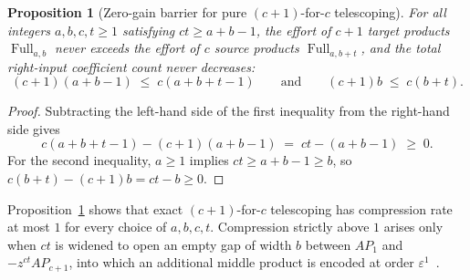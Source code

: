 \documentclass[11pt,a4paper]{article}
\theoremstyle{plain}
\newtheorem{proposition}[theorem]{Proposition}
\theoremstyle{definition}
\theoremstyle{remark}
\DeclareMathOperator{\Full}{Full}
\begin{document}
\begin{proposition}[Zero-gain barrier for pure $(c + 1)$-for-$c$ telescoping]
\label{prop:pure_telescoping}
For all integers $a, b, c, t \ge 1$ satisfying $ct \ge a + b - 1$, the effort of $c + 1$ target products $\Full_{a,b}$ never exceeds the effort of $c$ source products $\Full_{a, b+t}$, and the total right-input coefficient count never decreases:
\begin{equation}
    (c + 1)(a + b - 1) \;\le\; c(a + b + t - 1) \qquad\text{and}\qquad (c + 1)b \;\le\; c(b + t) .
    \label{eq:pure_tele_barrier}
\end{equation}
\end{proposition}
\begin{proof}
Subtracting the left-hand side of the first inequality from the right-hand side gives
\begin{equation}
    c(a + b + t - 1) - (c + 1)(a + b - 1) \;=\; ct - (a + b - 1) \;\ge\; 0 .
    \label{eq:pure_tele_diff}
\end{equation}
For the second inequality, $a \ge 1$ implies $ct \ge a + b - 1 \ge b$, so $c(b + t) - (c + 1)b = ct - b \ge 0$.
\end{proof}

Proposition~\ref{prop:pure_telescoping} shows that exact $(c + 1)$-for-$c$ telescoping has compression rate at most $1$ for every choice of $a, b, c, t$. Compression strictly above $1$ arises only when $ct$ is widened to open an empty gap of width $b$ between $A P_1$ and $-z^{ct} A P_{c+1}$, into which an additional middle product is encoded at order $\varepsilon^1$~\cite[Theorem~3.1]{Pass2026}.
\end{document}
